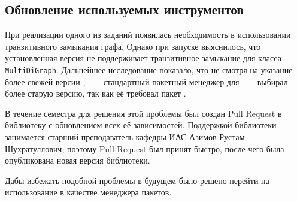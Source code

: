 \subsection{Обновление используемых инструментов}
\label{subsec:housekeeping}

При реализации одного из заданий появилась необходимость в использовании транзитивного замыкания графа.
Однако при запуске выяснилось, что установленная версия \networkx{} не поддерживает транзитивное замыкание для класса \texttt{MultiDiGraph}.
Дальнейшее исследование показало, что не смотря на указание более свежей версии \networkx{}, \pip{}~--- стандартный пакетный менеджер для \python{}~--- выбирал более старую версию, так как её требовал пакет \cfpqdata{}.

В течение семестра для решения этой проблемы был создан Pull Request в библиотеку \cfpqdata{} с обновлением всех её зависимостей.
Поддержкой библиотеки занимается старший преподаватель кафедры ИАС Азимов Рустам Шухратуллович, поэтому Pull Request был принят быстро, после чего была опубликована новая версия библиотеки.

Дабы избежать подобной проблемы в будущем было решено перейти на использование \poetry{} в качестве менеджера пакетов.

